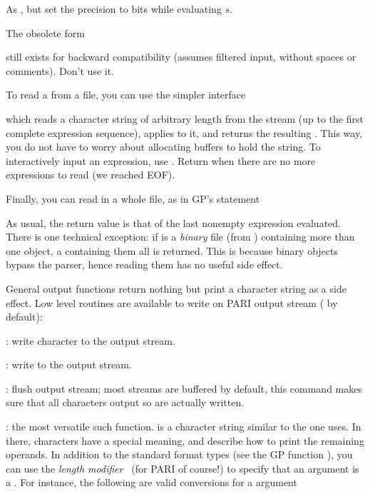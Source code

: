 As , but set the precision to  bits while evaluating $s$.

 The obsolete form


still exists for backward compatibility (assumes filtered input, without
spaces or comments). Don't use it.

To read a  from a file, you can use the simpler interface


\noindent which reads a character string of arbitrary length from the stream
 (up to the first complete expression sequence), applies
 to it, and returns the resulting . This way, you
do not have to worry about allocating buffers to hold the string. To
interactively input an expression, use .
Return  when there are no more expressions to read (we reached
EOF).

Finally, you can read in a whole file, as in GP's  statement


\noindent As usual, the return value is that of the last nonempty expression
evaluated. There is one technical exception: if  is a \emph{binary}
file (from ) containing more than one object, a 
containing them all is returned. This is because binary objects bypass the
parser, hence reading them has no useful side effect.


General output functions return nothing but print a character string as a
side effect. Low level routines are available to write on PARI output stream
 ( by default):

: write character  to the output stream.

: write  to the output stream.

: flush output stream; most streams are buffered by
default, this command makes sure that all characters output so are actually
written.

: the most versatile such
function.  is a character string similar to the one
 uses. In there, \kbd{\%} characters have a special meaning, and
describe how to print the remaining operands. In addition to the standard
format types (see the GP function ), you can use the \emph{length
modifier}~ (for PARI of course!) to specify that an argument is a
. For instance, the following are valid conversions for a 
argument
\bprog

